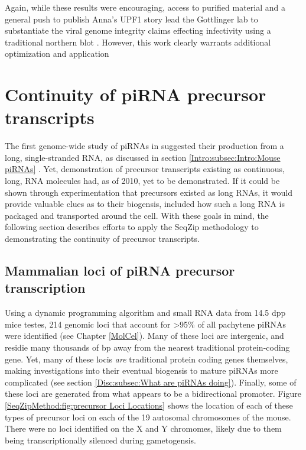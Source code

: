     Again, while these results were encouraging, access to purified material and a general push to publish Anna's UPF1 story lead the Gottlinger lab to substantiate the viral genome integrity claims effecting infectivity using a traditional northern blot \citep{Serquina2013a}. However, this work clearly warrants additional optimization and application

\section{Continuity of piRNA precursor transcripts}\label{SeqZipMethod:sec:Demonstrating continuous precursor TX by SeqZip}

  The first genome-wide study of piRNAs in \flies{} suggested their production from a long, single-stranded RNA, as discussed in section \ref{Intro:subsec:Intro:Mouse piRNAs} \citep{Brennecke2007}. Yet, demonstration of precursor transcripts existing as continuous, long, RNA molecules had, as of 2010, yet to be demonstrated. If it could be shown through experimentation that precursors existed as long RNAs, it would provide valuable clues as to their biogensis, included how such a long RNA is packaged and transported around the cell. With these goals in mind, the following section describes efforts to apply the SeqZip methodology to demonstrating the continuity of precursor transcripts.

  \subsection{Mammalian loci of piRNA precursor transcription}\label{SeqZipMethod:subsec:Mammalian Loci of precursor Tx}

    Using a dynamic programming algorithm and small RNA data from 14.5 dpp mice testes, 214 genomic loci that account for >95\% of all pachytene piRNAs were identified (see Chapter \ref{MolCel}). Many of these loci are intergenic, and residie many thousands of bp away from the nearest traditional protein-coding gene. Yet, many of these locis \textit{are} traditional protein coding genes themselves, making investigations into their eventual biogensis to mature piRNAs more complicated (see section \ref{Disc:subsec:What are piRNAs doing}). Finally, some of these loci are generated from what appears to be a bidirectional promoter. Figure \ref{SeqZipMethod:fig:precursor Loci Locations} shows the location of each of these types of precursor loci on each of the 19 autosomal chromosomes of the mouse. There were no loci identified on the X and Y chromomes, likely due to them being transcriptionally silenced during gametogensis. 

